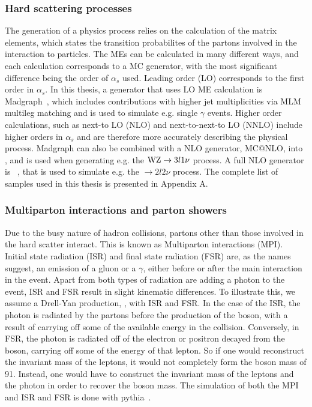 \subsubsection*{Hard scattering processes}
\noindent
\justify
The generation of a physics process relies on the calculation of the matrix elements, which states the transition probabilites of the partons involved in the interaction to particles. 
The MEs can be calculated in many different ways, and each calculation corresponds to a MC generator, with the most significant difference being the order of $\alpha_{s}$ used. 
Leading order (LO) corresponds to the first order in $\alpha_{s}$. 
In this thesis, a generator that uses LO ME calculation is Madgraph~\cite{Alwall:2014hca}, which includes contributions with higher jet multiplicities via MLM~\cite{Mangano:2006rw} multileg matching and is used to simulate e.g. single $\gamma$ events.
Higher order calculations, such as next-to LO (NLO) and next-to-next-to LO (NNLO) include higher orders in $\alpha_{s}$ and are therefore more accurately describing the physical process. 
Madgraph can also be combined with a NLO generator, MC@NLO, into \MGvATNLO, and is used when generating e.g. the $\mathrm{W}\mathrm{Z}\rightarrow 3l1\nu$ process.
A full NLO generator is \POWHEG~\cite{Oleari:2010nx,Alioli:2009je}, that is used to simulate e.g. the \ttbar$\rightarrow2l2\nu$ process. 
The complete list of samples used in this thesis is presented in Appendix A.
\subsubsection*{Multiparton interactions and parton showers}
\noindent
\justify
Due to the busy nature of hadron collisions, partons other than those involved in the hard scatter interact. This is known as Multiparton interactions (MPI). 
Initial state radiation (ISR) and final state radiation (FSR) are, as the names suggest, an emission of a gluon or a $\gamma$, either before or after the main interaction in the event.
Apart from both types of radiation are adding a photon to the event, ISR and FSR result in slight kinematic differences. 
To illustrate this, we assume a Drell-Yan production, \Zee, with ISR and FSR. 
In the case of the ISR, the photon is radiated by the partons before the production of the \PZ boson, with a result of carrying off some of the available energy in the collision. 
Conversely, in FSR, the photon is radiated off of the electron or positron decayed from the \PZ boson, carrying off some of the energy of that lepton. 
So if one would reconstruct the invariant mass of the leptons, it would not completely form the \PZ boson mass of 91\GeV. 
Instead, one would have to construct the invariant mass of the leptons and the photon in order to recover the \PZ boson mass. 
The simulation of both the MPI and ISR and FSR is done with {\sc pythia}~\cite{Sjostrand:2014zea}. 
